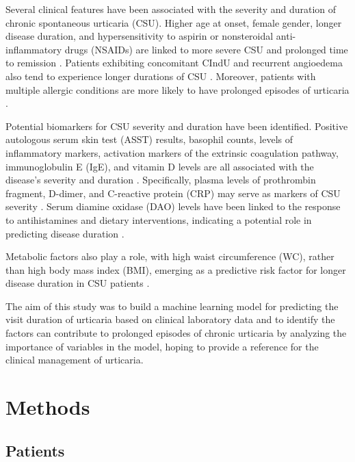 \documentclass[final,1p,times,authoryear]{elsarticle}
\begin{document}
Several clinical features have been associated with the severity and duration of chronic spontaneous urticaria (CSU). Higher age at onset, female gender, longer disease duration, and hypersensitivity to aspirin or nonsteroidal anti-inflammatory drugs (NSAIDs) are linked to more severe CSU and prolonged time to remission \citep{SanchezBorges2017Factors,Rabelo-Filardi2013Parameters}. Patients exhibiting concomitant CIndU and recurrent angioedema also tend to experience longer durations of CSU \citep{SanchezBorges2017Factors, Curto-Barredo2018Clinical}. Moreover, patients with multiple allergic conditions are more likely to have prolonged episodes of urticaria \citep{Lin2011Predictive}.

Potential biomarkers for CSU severity and duration have been identified. Positive autologous serum skin test (ASST) results, basophil counts, levels of inflammatory markers, activation markers of the extrinsic coagulation pathway, immunoglobulin E (IgE), and vitamin D levels are all associated with the disease's severity and duration \citep{SanchezBorges2017Factors,Rabelo-Filardi2013Parameters}. Specifically, plasma levels of prothrombin fragment, D-dimer, and C-reactive protein (CRP) may serve as markers of CSU severity \citep{Rabelo-Filardi2013Parameters}. Serum diamine oxidase (DAO) levels have been linked to the response to antihistamines and dietary interventions, indicating a potential role in predicting disease duration \citep{Chiang2022Predictors}.

Metabolic factors also play a role, with high waist circumference (WC), rather than high body mass index (BMI), emerging as a predictive risk factor for longer disease duration in CSU patients \citep{Kim2021High}.

The aim of this study was to build a machine learning model for predicting the visit duration of urticaria based on clinical laboratory data and to identify the factors can contribute to prolonged episodes of chronic urticaria by analyzing the importance of variables in the model, hoping to provide a reference for the clinical management of urticaria.

\section{Methods}\label{Methods}
\subsection{Patients}\label{Patients}
\end{document}
